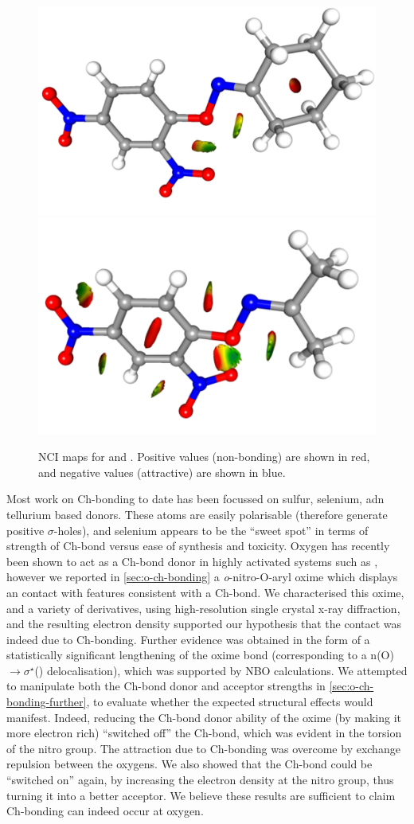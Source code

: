 \begin{refsection}
\begin{figure}
	\centering
	\includegraphics[angle=90,width=0.35\columnwidth]{Figures/cyclohexanone-oxime-dnp-nci.pdf}
	\includegraphics[angle=90,width=0.35\columnwidth]{Figures/acetone-oxime-dnp-nci.pdf}
	\caption[NCI maps for  and .]{NCI maps for  and . Positive values (non-bonding) are shown in red, and negative values (attractive) are shown in blue.}
\end{figure}

Most work on Ch-bonding to date has been focussed on sulfur, selenium, adn tellurium based donors.
These atoms are easily polarisable (therefore generate positive $\sigma$-holes), and selenium appears to be the ``sweet spot'' in terms of strength of Ch-bond versus ease of synthesis and toxicity.
Oxygen has recently been shown to act as a Ch-bond donor in highly activated systems such as , however we reported in \cref{sec:o-ch-bonding} a \textit{o}-nitro-O-aryl oxime which displays an  contact with features consistent with a Ch-bond.
We characterised this oxime, and a variety of derivatives, using high-resolution single crystal x-ray diffraction, and the resulting electron density supported our hypothesis that the contact was indeed due to Ch-bonding.
Further evidence was obtained in the form of a statistically significant lengthening of the  oxime bond (corresponding to a n(O)$ \rightarrow \sigma^{\star} $() delocalisation), which was supported by NBO calculations.
We attempted to manipulate both the Ch-bond donor and acceptor strengths in \cref{sec:o-ch-bonding-further}, to evaluate whether the expected structural effects would manifest.
Indeed, reducing the Ch-bond donor ability of the oxime (by making it more electron rich) ``switched off'' the Ch-bond, which was evident in the torsion of the nitro group.
The attraction due to Ch-bonding was overcome by exchange repulsion between the oxygens.
We also showed that the Ch-bond could be ``switched on'' again, by increasing the electron density at the nitro group, thus turning it into a better acceptor.
We believe these results are sufficient to claim Ch-bonding can indeed occur at oxygen.


\end{refsection}
